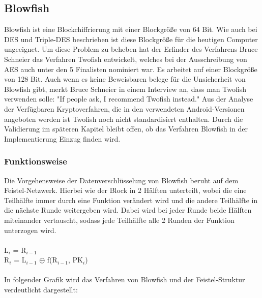 \documentclass[10pt, a4paper,headsepline]{scrreprt}
\begin{document}
\subsection{Blowfish}
Blowfish ist eine Blockchiffrierung mit einer Blockgröße von 64 Bit. Wie auch bei DES und Triple-DES beschrieben ist diese Blockgröße für die heutigen Computer ungeeignet. Um diese Problem zu beheben hat der Erfinder des Verfahrens Bruce Schneier das Verfahren Twofish entwickelt, welches bei der Ausschreibung von AES auch unter den 5 Finalisten nominiert war. Es arbeitet auf einer Blockgröße von 128 Bit. Auch wenn es keine Beweisbaren belege für die Unsicherheit von Blowfish gibt, merkt Bruce Schneier in einem Interview an, dass man Twofish verwenden solle: "If people ask, I recommend Twofish instead." %
Aus der Analyse der Verfügbaren Kryptoverfahren, die in den verwendeten Android-Versionen angeboten werden ist Twofish noch nicht standardisiert enthalten. Durch die Validierung im späteren Kapitel bleibt offen, ob das Verfahren Blowfish in der Implementierung Einzug finden wird.

\subsubsection{Funktionsweise}
Die Vorgehensweise der Datenverschlüsselung von Blowfish beruht auf dem Feistel-Netzwerk. Hierbei wie der Block in 2 Hälften unterteilt, wobei die eine Teilhälfte immer durch eine Funktion verändert wird und die andere Teilhälfte in die nächste Runde weitergeben wird. Dabei wird bei jeder Runde beide Hälften miteinander vertauscht, sodass jede Teilhälfte alle 2 Runden der Funktion unterzogen wird. \\ \\
L$_{i}$ = R$_{i-1}$ \\
R$_{i}$ = L$_{i-1}$ $\oplus$ f(R$_{i-1}$, PK$_{i}$) \\ \\
In folgender Grafik wird das Verfahren von Blowfish und der Feistel-Struktur verdeutlicht dargestellt: \\ \\
\end{document}
